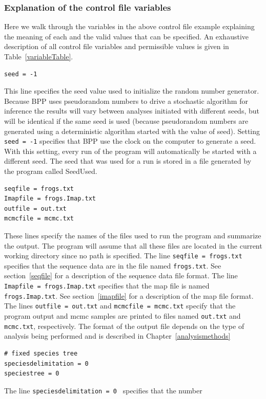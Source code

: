 \documentclass[a4paper]{book}
\numberwithin{equation}{section} \renewcommand{\baselinestretch}{0.55}
\begin{document}
\subsubsection{Explanation of the control file variables}
Here we walk through the variables in the above control file example
explaining the meaning of each and the valid values that can be
specified. An exhaustive description of all control file variables and
permissible values is given in Table~\ref{variableTable}.
\begin{verbatim}
seed = -1
\end{verbatim}
This line specifies the seed value used to initialize the random
number generator. Because BPP uses pseudorandom numbers to drive a
stochastic algorithm for inference the results will vary between
analyses initiated with different seeds, but will be identical if the
same seed is used (because pseudorandom numbers are generated using a
deterministic algorithm started with the value of seed).  Setting
\texttt{seed = -1} specifies that BPP use the clock on the computer to
generate a seed. With this setting, every run of the program will
automatically be started with a different seed. The seed that was used
for a run is stored in a file generated by the program called
SeedUsed.
\begin{verbatim}
seqfile = frogs.txt
Imapfile = frogs.Imap.txt
outfile = out.txt
mcmcfile = mcmc.txt
\end{verbatim}
These lines specify the names of the files used to run the program and
summarize the output.  The program will assume that all these files
are located in the current working directory since no path is
specified. The line \texttt{seqfile = frogs.txt} specifies that the
sequence data are in the file named \texttt{frogs.txt}. See
section~\ref{seqfile} for a description of the sequence data file
format.  The line \texttt{Imapfile = frogs.Imap.txt} specifies that
the map file is named \texttt{frogs.Imap.txt}. See
section~\ref{imapfile} for a description of the map file format.  The
lines \texttt{outfile = out.txt} and \texttt{mcmcfile = mcmc.txt}
specify that the program output and mcmc samples are printed to files
named \texttt{out.txt} and \texttt{mcmc.txt}, respectively.  The
format of the output file depends on the type of analysis being
performed and is described in Chapter~\ref{analysismethods}
\begin{verbatim}
# fixed species tree
speciesdelimitation = 0 
speciestree = 0
\end{verbatim}
The line \texttt{speciesdelimitation = 0 } specifies that the number
\end{document}
